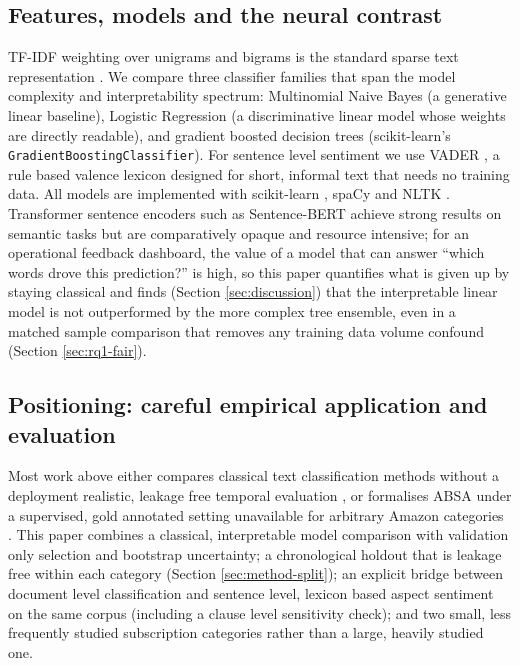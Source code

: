 \documentclass[11pt,a4paper,DIV=12]{scrartcl}
\begin{document}
\subsection{Features, models and the neural contrast}
TF-IDF weighting over unigrams and bigrams is the standard sparse text
representation \citep{manning2008introduction}. We compare three classifier
families that span the model complexity and interpretability spectrum: Multinomial
Naive Bayes (a generative linear baseline), Logistic Regression (a discriminative
linear model whose weights are directly readable), and gradient boosted decision
trees (scikit-learn's \texttt{GradientBoostingClassifier}). For sentence level
sentiment we use VADER \citep{hutto2014vader}, a rule based valence lexicon
designed for short, informal text that needs no training data. All models are
implemented with scikit-learn \citep{pedregosa2011scikit}, spaCy
\citep{honnibal2020spacy} and NLTK \citep{bird2009natural}. Transformer
sentence encoders such as Sentence-BERT \citep{reimers2019sentencebert}
achieve strong results on semantic tasks but are comparatively opaque and
resource intensive; for an operational feedback dashboard, the value of a
model that can answer ``which words drove this prediction?'' is high,
so this paper quantifies what is given up by staying classical and finds
(Section \ref{sec:discussion}) that the interpretable linear model is not
outperformed by the more complex tree ensemble, even in a matched sample
comparison that removes any training data volume confound (Section
\ref{sec:rq1-fair}).

\subsection{Positioning: careful empirical application and evaluation}
Most work above either compares classical text classification methods without
a deployment realistic, leakage free temporal evaluation
\citep{maas2011learning}, or formalises ABSA under a supervised,
gold annotated setting unavailable for arbitrary Amazon categories
\citep{pontiki2014semeval}. This paper combines a classical, interpretable
model comparison with validation only selection and bootstrap uncertainty; a
chronological holdout that is leakage free within each category
(Section \ref{sec:method-split}); an explicit bridge between
document level classification and sentence level, lexicon based aspect
sentiment on the same corpus (including a clause level sensitivity
check); and two small, less frequently studied subscription categories rather than a
large, heavily studied one.
\end{document}
